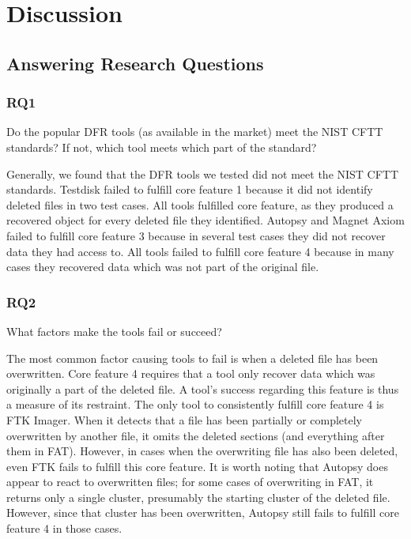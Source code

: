 \section{Discussion}

\subsection{Answering Research Questions}
\subsubsection{RQ1}
Do the popular DFR tools (as available in the market) meet the NIST CFTT standards? 
If not, which tool meets which part of the standard? 

Generally, we found that the DFR tools we tested did not meet the NIST CFTT standards.
Testdisk failed to fulfill core feature 1 because it did not identify deleted files in two test cases.
All tools fulfilled core feature, as they produced a recovered object for every deleted file they identified.
Autopsy and Magnet Axiom failed to fulfill core feature 3 because in several test cases they did not recover data they had access to.
All tools failed to fulfill core feature 4 because in many cases they recovered data which was not part of the original file.

\subsubsection{RQ2}
What factors make the tools fail or succeed?

The most common factor causing tools to fail is when a deleted file has been overwritten.
Core feature 4 requires that a tool only recover data which was originally a part of the deleted file.
A tool's success regarding this feature is thus a measure of its restraint.
The only tool to consistently fulfill core feature 4 is FTK Imager.
When it detects that a file has been partially or completely overwritten by another file, it omits the deleted sections (and everything after them in FAT).
However, in cases when the overwriting file has also been deleted, even FTK fails to fulfill this core feature.
It is worth noting that Autopsy does appear to react to overwritten files; for some cases of overwriting in FAT, it returns only a single cluster, presumably the starting cluster of the deleted file.
However, since that cluster has been overwritten, Autopsy still fails to fulfill core feature 4 in those cases.

